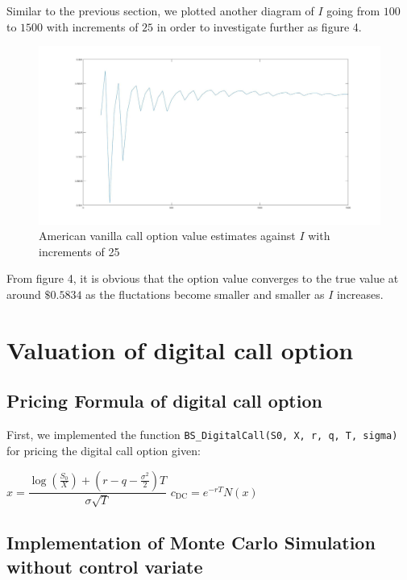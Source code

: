 Similar to the previous section, we plotted another diagram of $I$ going from $100$ to $1500$ with increments of $25$ in order to investigate further as figure 4.

\begin{figure}[htbp!]
	\centering
	\includegraphics[scale=0.2]{largePlot2.jpg}
	\caption{American vanilla call option value estimates against $I$ with increments of 25}
\end{figure}

From figure 4, it is obvious that the option value converges to the true value at around $\$0.5834$ as the fluctations become smaller and smaller as $I$ increases.

\section{Valuation of digital call option}

\subsection{Pricing Formula of digital call option}

First, we implemented the function \texttt{BS\_DigitalCall(S0, X, r, q,  T, sigma)} for pricing the digital call option given:

\begin{algorithm}[H]
	$x = \dfrac{\log \left(\frac{S_0}{X}\right) + (r - q - \frac{\sigma^2}{2})T}{\sigma \sqrt{T}}$\;
	$c_{\text{DC}} = e^{-rT} N(x)$\;
\end{algorithm}

\subsection{Implementation of Monte Carlo Simulation without control variate}

